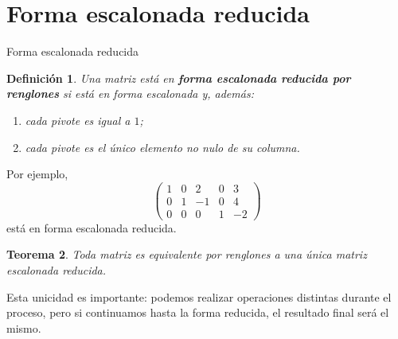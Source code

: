 \documentclass[aspectratio=169,9pt]{beamer}
\newtheorem{definicion}{Definición}[section]
\newtheorem{teorema}[definicion]{Teorema}
\theoremstyle{remark}
\begin{document}
\section{Forma escalonada reducida}
\begin{frame}[allowframebreaks,t]{Forma escalonada reducida}
\begin{definicion}
Una matriz está en \textbf{forma escalonada reducida por renglones} si está en forma escalonada y,
además:
\begin{enumerate}
\item cada pivote es igual a $1$;
\item cada pivote es el único elemento no nulo de su columna.
\end{enumerate}
\end{definicion}

Por ejemplo,
\[
\begin{pmatrix}
1&0&2&0&3\\
0&1&-1&0&4\\
0&0&0&1&-2
\end{pmatrix}
\]
está en forma escalonada reducida.

\begin{teorema}
Toda matriz es equivalente por renglones a una única matriz escalonada reducida.
\end{teorema}

Esta unicidad es importante: podemos realizar operaciones distintas durante el proceso, pero si
continuamos hasta la forma reducida, el resultado final será el mismo.
\end{frame}
\end{document}

